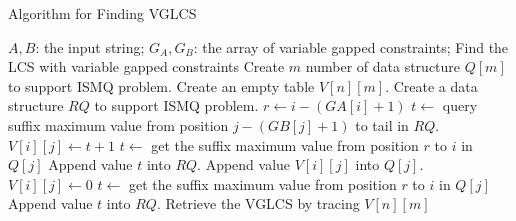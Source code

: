 \begin{algorithm*}[!thb]
  \caption{Algorithm for Finding VGLCS~\cite{Peng2011TheLC}}
  \label{alg:serial-VGLCS}
  \begin{algorithmic}[1]
    \Require
      $A, B$: the input string;
      $G_A, G_B$: the array of variable gapped constraints;
    \Ensure Find the LCS with variable gapped constraints
    \State Create $m$ number of data structure $Q[m]$ to support ISMQ problem.
    \State Create an empty table $V[n][m]$.
      \State Create a data structure $RQ$ to support ISMQ problem.
      \State $r \gets i - (GA[i]+1)$
            \State $t \gets $ query suffix maximum value from position $j - (GB[j]+1)$ to tail in $RQ$.
            \State $V[i][j] \gets t + 1$
            \State $t \gets $ get the suffix maximum value from position $r$ to $i$ in $Q[j]$
            \State Append value $t$ into $RQ$.
            \State Append value $V[i][j]$ into $Q[j]$.
        \Else
            \State $V[i][j] \gets 0$
            \State $t \gets $ get the suffix maximum value from position $r$ to $i$ in $Q[j]$
            \State Append value $t$ into $RQ$.
        \EndIf
      \EndFor
    \EndFor
    \State Retrieve the VGLCS by tracing $V[n][m]$
  \end{algorithmic}
\end{algorithm*}
